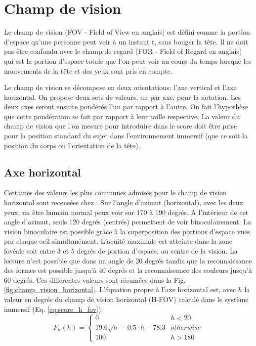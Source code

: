 	\section{Champ de vision}
	\par Le champ de vision (FOV - Field of View en anglais) est défini comme la portion d'espace qu'une personne peut voir à un instant t, sans bouger la tête. Il ne doit pas être confondu avec le champ de regard (FOR - Field of Regard en anglais) qui est la portion d'espace totale que l'on peut voir au cours du temps lorsque les mouvements de la tête et des yeux sont pris en compte.

	\par Le champ de vision se décompose en deux orientations: l'axe vertical et l'axe horizontal. On propose deux sets de valeurs, un par axe, pour la notation. Les deux axes seront ensuite pondérés l'un par rapport à l'autre. On fait l'hypothèse que cette pondération se fait par rapport à leur taille respective. La valeur du champ de vision que l'on mesure pour introduire dans le score doit être prise pour la position standard du sujet dans l'environnement immersif (que ce soit la position du corps ou l'orientation de la tête).
	
	\subsection{Axe horizontal}
	\par Certaines des valeurs les plus communes admises pour le champ de vision horizontal sont recensées chez \citep{devisme_optimisation_2004}. Sur l'angle d'azimut (horizontal), avec les deux yeux, un être humain normal peux voir sur 170 à 190 degrés. A l'intérieur de cet angle d'azimut, seuls 120 degrés (centrés) permettent de voir binoculairement. La vision binoculaire est possible grâce à la superposition des portions d'espace vues par chaque oeil simultanément. L'acuité maximale est atteinte dans la zone fovéale soit entre 3 et 5 degrés de portion d'espace, au centre de la vision. La lecture n'est possible que dans un angle de 20 degrés tandis que la reconnaissance des formes est possible jusqu'à 40 degrés et la reconnaissance des couleurs jusqu'à 60 degrés. Ces différentes valeurs sont résumées dans la Fig. \ref{fig:champ_vision_horizontal}. L'équation propre à l'axe horizontal est, avec $h$ la valeur en degrés du champ de vision horizontal (H-FOV) calculé dans le système immersif (Eq. \ref{eq:score_h_fov}):
	\begin{equation}
	F_h(h) = \begin{cases}
		0 & h < 20\\
		19.6 \sqrt{h} -0.5 \cdot h -78.3 & otherwise\\
		100 & h > 180
	\end{cases}
	\label{eq:score_h_fov}
	\end{equation}
	
